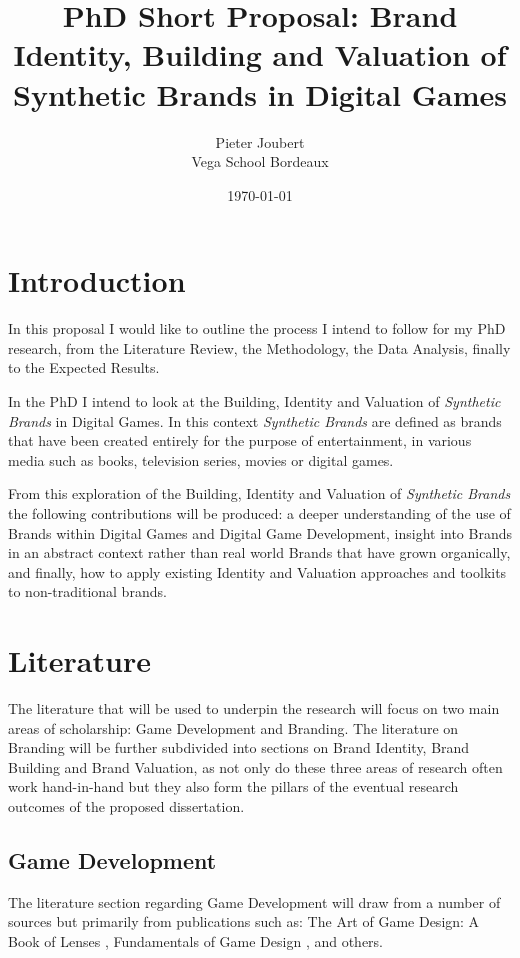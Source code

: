 \documentclass[10pt,twoside]{article}
\title{PhD Short Proposal: Brand Identity, Building and Valuation of Synthetic Brands in Digital Games}
\author{Pieter Joubert \\
	Vega School Bordeaux \\
	}
\date{\today}
\begin{document}
\maketitle

\section{Introduction}

In this proposal I would like to outline the process I intend to follow for my PhD research, from the Literature Review, the Methodology, the Data Analysis, finally to the Expected Results. 

In the PhD I intend to look at the Building, Identity and Valuation of \emph{Synthetic Brands} in Digital Games. In this context \emph{Synthetic Brands} are defined as brands that have been created entirely for the purpose of entertainment, in various media such as books, television series, movies or digital games.

From this exploration of the Building, Identity and Valuation of \emph{Synthetic Brands} the following contributions will be produced: a deeper understanding of the use of Brands within Digital Games and Digital Game Development, insight into Brands in an abstract context rather than real world Brands that have grown organically, and finally, how to apply existing Identity and Valuation approaches and toolkits to non-traditional brands.

\section{Literature}

The literature that will be used to underpin the research will focus on two main areas of scholarship: Game Development and Branding. The literature on Branding will be further subdivided into sections on Brand Identity, Brand Building and Brand Valuation, as not only do these three areas of research often work hand-in-hand but they also form the pillars of the eventual research outcomes of the proposed dissertation.

\subsection{Game Development}

The literature section regarding Game Development will draw from a number of sources but primarily from publications such as: The Art of Game Design: A Book of Lenses \cite{schell2008art}, Fundamentals of Game Design \cite{adams2014fundamentals}, and others.
\end{document}
